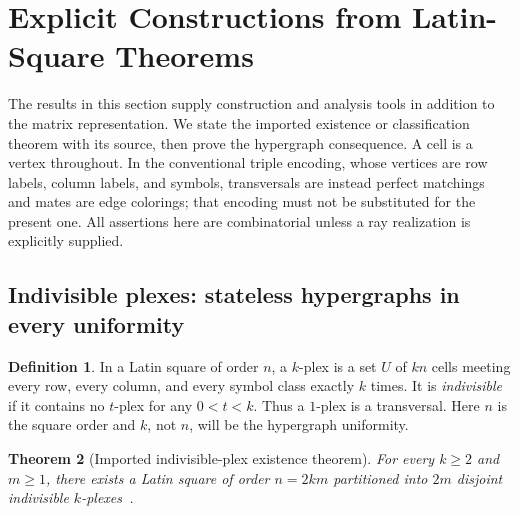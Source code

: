 \documentclass[aps,pra,reprint,superscriptaddress,longbibliography,nofootinbib,floatfix,10pt]{revtex4-2}
\newtheorem{theorem}{Theorem}
\theoremstyle{definition}\newtheorem{definition}[theorem]{Definition}
\theoremstyle{remark}\newtheorem{remark}[theorem]{Remark}
\begin{document}
\section{Explicit Constructions from Latin-Square Theorems}\label{sec:constructive}

The results in this section supply construction and analysis tools in addition to the matrix representation. We state the imported existence or classification theorem with its source, then prove the hypergraph consequence. A cell is a vertex throughout. In the conventional triple encoding, whose vertices are row labels, column labels, and symbols, transversals are instead perfect matchings and mates are edge colorings; that encoding must not be substituted for the present one. All assertions here are combinatorial unless a ray realization is explicitly supplied.

\subsection{Indivisible plexes: stateless hypergraphs in every uniformity}\label{sec:plexes}

\begin{definition}
In a Latin square of order $n$, a $k$-plex is a set $U$ of $kn$ cells meeting every row, every column, and every symbol class exactly $k$ times. It is \emph{indivisible} if it contains no $t$-plex for any $0<t<k$. Thus a $1$-plex is a transversal. Here $n$ is the square order and $k$, not $n$, will be the hypergraph uniformity.
\end{definition}

\begin{theorem}[Imported indivisible-plex existence theorem]\label{thm:imported-plex}
For every $k\ge2$ and $m\ge1$, there exists a Latin square of order $n=2km$ partitioned into $2m$ disjoint indivisible $k$-plexes~\cite[Theorems 1.1--1.2]{bryant2009indivisible}.
\end{theorem}
\end{document}
